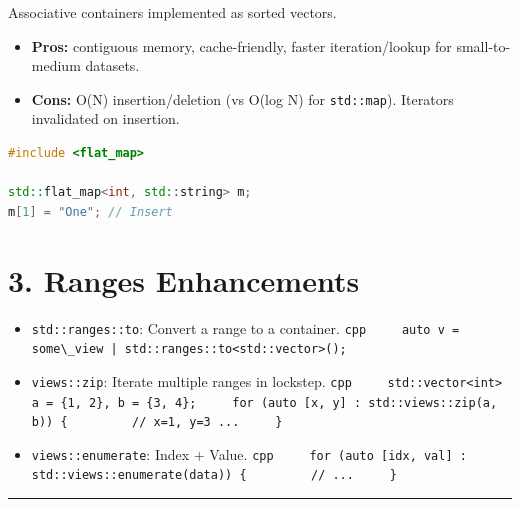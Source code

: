 Associative containers implemented as sorted vectors.

\begin{itemize}
\tightlist
\item
  \textbf{Pros:} contiguous memory, cache-friendly, faster
  iteration/lookup for small-to-medium datasets.
\item
  \textbf{Cons:} O(N) insertion/deletion (vs O(log N) for
  \passthrough{\lstinline!std::map!}). Iterators invalidated on
  insertion.
\end{itemize}

\begin{lstlisting}[language={C++}]
#include <flat_map>

std::flat_map<int, std::string> m;
m[1] = "One"; // Insert
\end{lstlisting}

\hypertarget{ranges-enhancements}{%
\section{3. Ranges Enhancements}\label{ranges-enhancements}}

\begin{itemize}
\tightlist
\item
  \passthrough{\lstinline!std::ranges::to!}: Convert a range to a
  container.
  \passthrough{\lstinline!cpp     auto v = some\_view | std::ranges::to<std::vector>();!}
\item
  \passthrough{\lstinline!views::zip!}: Iterate multiple ranges in
  lockstep.
  \passthrough{\lstinline!cpp     std::vector<int> a = \{1, 2\}, b = \{3, 4\};     for (auto [x, y] : std::views::zip(a, b)) \{         // x=1, y=3 ...     \}!}
\item
  \passthrough{\lstinline!views::enumerate!}: Index + Value.
  \passthrough{\lstinline!cpp     for (auto [idx, val] : std::views::enumerate(data)) \{         // ...     \}!}
\end{itemize}

\begin{center}\rule{0.5\linewidth}{0.5pt}\end{center}
